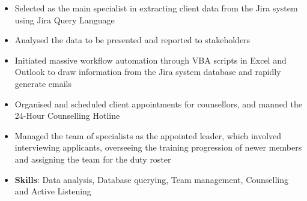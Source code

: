 \documentclass{cv}
\begin{document}
\begin{subsections}
    \subtitle{SAF Counselling Centre \hfill Singapore}
    \begin{itemize}
        \item Selected as the main specialist in extracting client data from the Jira system using Jira Query Language
        \item Analysed the data to be presented and reported to stakeholders
        \item Initiated massive workflow automation through VBA scripts in Excel and Outlook to draw information from the Jira system database and rapidly generate emails
        \item Organised and scheduled client appointments for counsellors, and manned the 24-Hour Counselling Hotline
        \item Managed the team of specialists as the appointed leader, which involved interviewing applicants, overseeing the training progression of newer members and assigning the team for the duty roster
        \item \textbf{Skills}: Data analysis, Database querying, Team management, Counselling and Active Listening
    \end{itemize}
\end{subsections}



\end{document}
